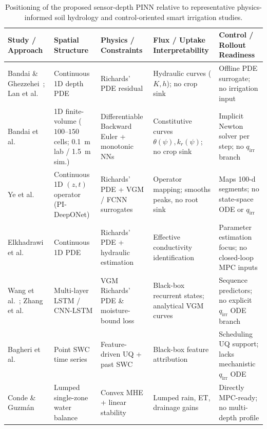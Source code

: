 \documentclass[pdflatex,sn-nature]{sn-jnl}%
\theoremstyle{thmstyleone}%
\theoremstyle{thmstyletwo}%
\theoremstyle{thmstylethree}%
\begin{document}
\begin{table}[!htbp]
\centering
\caption{Positioning of the proposed sensor-depth PINN relative to representative physics-informed soil hydrology and control-oriented smart irrigation studies.}
\label{tab:lit_comparison}
\scriptsize
\setlength{\tabcolsep}{2.5pt}
\begin{tabular}{@{}>{\raggedright\arraybackslash}p{}>{\raggedright\arraybackslash}p{}>{\raggedright\arraybackslash}p{}>{\raggedright\arraybackslash}p{}>{\raggedright\arraybackslash}p{}@{}}
\toprule
\textbf{Study / Approach} & \textbf{Spatial Structure} & \textbf{Physics / Constraints} & \textbf{Flux / Uptake Interpretability} & \textbf{Control / Rollout Readiness} \\
\midrule
Bandai \& Ghezzehei~\cite{Bandai2022}; Lan et al.~\cite{Lan2024} & Continuous 1D depth PDE & Richards' PDE residual & Hydraulic curves ($K, h$); no crop sink & Offline PDE surrogate; no irrigation input \\
Bandai et al.~\cite{Bandai2024} & 1D finite-volume ($100\text{--}150$ cells; \SI{0.1}{m} lab / \SI{1.5}{m} sim.) & Differentiable Backward Euler + monotonic NNs & Constitutive curves $\theta(\psi), k_r(\psi)$; no crop sink & Implicit Newton solver per step; no $q_{\mathrm{irr}}$ branch \\
Ye et al.~\cite{Ye2025} & Continuous 1D $(z,t)$ operator (PI-DeepONet) & Richards' PDE + VGM / FCNN surrogates & Operator mapping; smooths peaks, no root sink & Maps 100-d segments; no state-space ODE or $q_{\mathrm{irr}}$ \\
Elkhadrawi et al.~\cite{Elkha2024} & Continuous 1D PDE & Richards' PDE + hydraulic estimation & Effective conductivity identification & Parameter estimation focus; no closed-loop MPC inputs \\
Wang et al.~\cite{WangY2023}; Zhang et al.~\cite{ZhangT2025} & Multi-layer LSTM / CNN-LSTM & VGM Richards' PDE \& moisture-bound loss & Black-box recurrent states; analytical VGM curves & Sequence predictors; no explicit $q_{\mathrm{irr}}$ ODE branch \\
Bagheri et al.~\cite{Bagheri2025} & Point SWC time series & Feature-driven UQ + past SWC & Black-box feature attribution & Scheduling UQ support; lacks mechanistic $q_{\mathrm{irr}}$ ODE \\
Conde \& Guzm\'an~\cite{condeforecast2024} & Lumped single-zone water balance & Convex MHE + linear stability & Lumped rain, ET, drainage gains & Directly MPC-ready; no multi-depth profile \\

\end{tabular}
\end{table}
\end{document}
